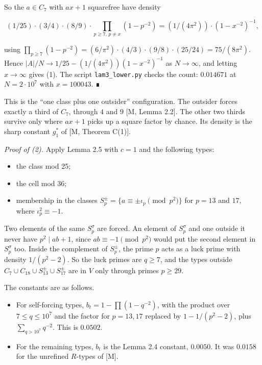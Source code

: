 \documentclass[
  11pt,
]{article}
\providecommand{\tightlist}{%
  \setlength{\itemsep}{0pt}\setlength{\parskip}{0pt}}
\begin{document}
So the \(a \in C_7\) with \(ax + 1\) squarefree have density

\[(1/25)\cdot(3/4)\cdot(8/9)\cdot\prod_{p\ge 7,\, p\ne x}(1 - p^{-2}) = (1/(4\pi^2))\cdot(1 - x^{-2})^{-1},\]

using
\(\prod_{p\ge 7}(1 - p^{-2}) = (6/\pi^2)\cdot(4/3)\cdot(9/8)\cdot(25/24) = 75/(8\pi^2)\).
Hence \(|A|/N \to 1/25 - (1/(4\pi^2))(1 - x^{-2})^{-1}\) as
\(N \to \infty\), and letting \(x \to \infty\) gives (1). The script
\texttt{lam3\_lower.py} checks the count: \(0.014671\) at
\(N = 2\cdot 10^{7}\) with \(x = 100043\). ∎

This is the ``one class plus one outsider'' configuration. The outsider
forces exactly a third of \(C_7\), through \(4\) and \(9\) {[}M, Lemma
2.2{]}. The other two thirds survive only where \(ax + 1\) picks up a
square factor by chance. Its density is the sharp constant \(g_1^*\) of
{[}M, Theorem C(1){]}.

\emph{Proof of (2).} Apply Lemma 2.5 with \(c = 1\) and the following
types:

\begin{itemize}
\tightlist
\item
  the class mod 25;
\item
  the cell mod 36;
\item
  membership in the classes
  \(S_p^\pm = \{a \equiv \pm\iota_p \pmod{p^2}\}\) for \(p = 13\) and
  \(17\), where \(\iota_p^2 \equiv -1\).
\end{itemize}

Two elements of the same \(S_p^\sigma\) are forced. An element of
\(S_p^\sigma\) and one outside it never have \(p^2 \mid ab + 1\), since
\(ab \equiv -1 \pmod{p^2}\) would put the second element in
\(S_p^\sigma\) too. Inside the complement of \(S_p^\pm\), the prime
\(p\) acts as a luck prime with density \(1/(p^2 - 2)\). So the luck
primes are \(q \ge 7\), and the types outside
\(C_7 \cup C_{18} \cup S_{13}^\pm \cup S_{17}^\pm\) are in \(V\) only
through primes \(p \ge 29\).

The constants are as follows.

\begin{itemize}
\tightlist
\item
  For self-forcing types, \(b_t = 1 - \prod(1 - q^{-2})\), with the
  product over \(7 \le q \le 10^{7}\) and the factor for \(p = 13, 17\)
  replaced by \(1 - 1/(p^2 - 2)\), plus \(\sum_{q>10^{7}} q^{-2}\). This
  is \(0.0502\).
\item
  For the remaining types, \(b_t\) is the Lemma 2.4 constant,
  \(0.0050\). It was \(0.0158\) for the unrefined \(R\)-types of
  {[}M{]}.
\end{itemize}
\end{document}
